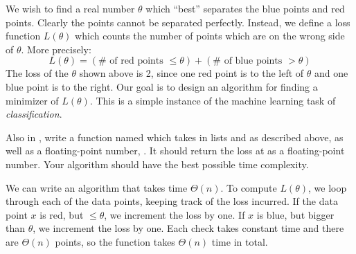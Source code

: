 \begin{progprob}
\begin{center}
        \end{center}        

        We wish to find a real number $\theta$ which ``best'' separates the
        blue points and red points. Clearly the points cannot be separated
        perfectly. Instead, we define a loss function $L(\theta)$ which
        counts the number of points which are on the wrong side of
        $\theta$.  More precisely:
        \[
            L(\theta) = (\# \text{ of red points }\leq \theta) + (\# \text{ of blue points } > \theta)
        \]
        The loss of the $\theta$ shown above is 2, since one red point is to the
        left of $\theta$ and one blue point is to the right.
        Our goal is to design an algorithm for finding a minimizer of
        $L(\theta)$. This is a simple instance of the machine learning task
        of \emph{classification}.

    \begin{subprobset}

        \begin{subprob}
            Also in , write a function named
             which takes in lists
             and  as described above, as well
            as a floating-point number, . It should return
            the loss at  as a floating-point number.  Your
            algorithm should have the best possible time complexity.

            \begin{soln}
                We can write an algorithm that takes time $\Theta(n)$. To compute
                $L(\theta)$, we loop through each of the data points, keeping track of the
                loss incurred. If the data point $x$ is red, but $\leq \theta$, we
                increment the loss by one. If $x$ is blue, but bigger than $\theta$, we
                increment the loss by one. Each check takes constant time and there are
                $\Theta(n)$ points, so the function takes $\Theta(n)$ time in total.

                \inputminted{python}{\thisdir/include-solution/compute_ell.py}

            \end{soln}
            

\end{subprob}
\end{subprobset}
\end{progprob}
